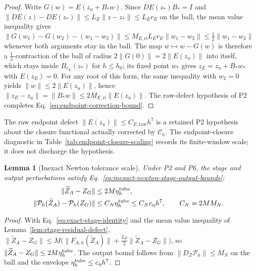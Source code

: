 \documentclass[preprint,12pt]{elsarticle}
\newtheorem{lemma}{Lemma}
\begin{document}
\begin{proof}
Write $G(w)=E(z_u+B_\ast w)$. Since $DE(z_\ast)B_\ast=I$ and
$\|DE(z)-DE(z_\ast)\|\le L_E\|z-z_\ast\|\le L_Er_E$ on the ball, the mean
value inequality gives
$\|G(w_1)-G(w_2)-(w_1-w_2)\|\le M_{E,\mathrm{ri}}L_Er_E\|w_1-w_2\|
\le\tfrac12\|w_1-w_2\|$ whenever both arguments stay in the ball. The map
$w\mapsto w-G(w)$ is therefore a $\tfrac12$-contraction of the ball of radius
$2\|G(0)\|=2\|E(z_u)\|$ into itself, which stays inside $B_{r_E}(z_\ast)$
for $h\le h_0$; its fixed point $w_\ast$ gives $z_E=z_u+B_\ast w_\ast$ with
$E(z_E)=0$. For any root of this form, the same inequality with $w_2=0$
yields $\|w\|\le2\|E(z_u)\|$, hence
$\|z_E-z_u\|=\|B_\ast w\|\le2M_{E,\mathrm{ri}}\|E(z_u)\|$. The raw-defect
hypothesis of P2 completes Eq.~\eqref{eq:endpoint-correction-bound}.
\end{proof}

The raw endpoint defect $\|E(z_u)\|\le C_{E,\mathrm{raw}}h^7$ is a retained
P2 hypothesis about the closure functional actually corrected by
$\mathcal C_h$. The endpoint-closure diagnostic in
Table~\ref{tab:endpoint-closure-scaling} records its finite-window scale;
it does not discharge the hypothesis.

\begin{lemma}[Inexact Newton tolerance scale]
\label{lem:inexact-newton}
Under P2 and P6, the stage and output perturbations satisfy
Eq.~\eqref{eq:inexact-newton-stage-output-bounds}:
\begin{equation}
\label{eq:inexact-newton-stage-output-bounds}
\begin{aligned}
  \|\widetilde Z_A-Z_G\|&\le 2M\eta_h^{\rm tube},\\
  \|\mathcal P_h(\widetilde Z_A)-\mathcal P_h(Z_G)\|
  &\le C_N\eta_h^{\rm tube}\le C_Nc_\eta h^7,\qquad C_N=2MM_N .
\end{aligned}
\end{equation}
\end{lemma}

\begin{proof}
With Eq.~\eqref{eq:exact-stage-identity} and the mean value inequality of
Lemma~\ref{lem:stage-residual-defect},
$\|\widetilde Z_A-Z_G\|\le M\bigl(\|F_{A,h}(\widetilde Z_A)\|
+\tfrac{L\rho}{2}\|\widetilde Z_A-Z_G\|\bigr)$, so
$\|\widetilde Z_A-Z_G\|\le 2M\eta_h^{\rm tube}$. The output bound follows
from $\|D_Z\mathcal P_h\|\le M_N$ on the ball and the envelope
$\eta_h^{\rm tube}\le c_\eta h^7$.
\end{proof}
\end{document}

